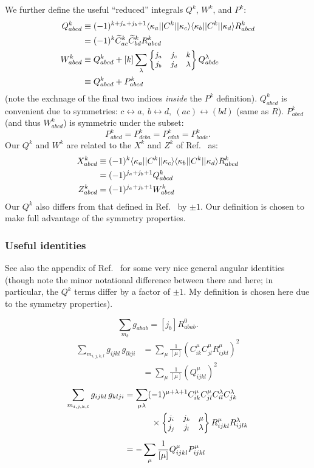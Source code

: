 \documentclass[10pt,twocolumn,a4paper]{article}%
\newcommand{\bra}[1]{\ensuremath{\langle #1|}}	%
\newcommand{\ket}[1]{\ensuremath{|#1\rangle}}	%
\newcommand{\sixj}[6]{\small\ensuremath{\begin{Bmatrix}#1&#2&#3\\#4&#5&#6\end{Bmatrix}}}	%
\newcommand{\be}{\begin{equation}}
\newcommand{\ee}{\end{equation}}
\renewcommand{\k}{\ensuremath{\kappa}}
\begin{document}
We further define the useful ``reduced'' integrals $Q^k$, $W^k$, and $P^k$:
\begin{align}
Q^k_{abcd} &\equiv  (-1)^{k + j_a+j_b+1}\bra{\k_a}|C^k|\ket{\k_c} \bra{\k_b}|C^k|\ket{\k_d} R^k_{abcd} \notag\\
&= (-1)^k \widetilde C^k_{ac}\widetilde C^k_{bd}R^k_{abcd}\\
%
W^k_{abcd} &\equiv Q^k_{abcd} + [k] \sum_\lambda \sixj{j_a}{j_c}{k}{j_b}{j_d}{\lambda}Q^\lambda_{abdc} \notag\\
& \equiv Q^k_{abcd}  + P^k_{abcd}
\end{align}
(note the exchnage of the final two indices {\em inside} the $P^k$ definition).
$Q^k_{abcd}$  is convenient due to symmetries: $c\leftrightarrow a ,~ b\leftrightarrow d  ,~ (ac)\leftrightarrow (bd)$ (same as $R$).
$P^k_{abcd}$ (and thus $W^k_{abcd}$) is symmetric under the subset:
\be
P^k_{abcd} = P^k_{dcba} = P^k_{cdab} = P^k_{badc}.
\ee
Our $Q^k$ and $W^k$ are related to the $X^k$ and $Z^k$ of Ref.~\cite{Lindgren1986} as:
\begin{align}
X^k_{abcd} &\equiv  (-1)^k \bra{\k_a}|C^k|\ket{\k_c} \bra{\k_b}|C^k|\ket{\k_d} R^k_{abcd} \notag\\
 & = (-1)^{j_a+j_b+1}Q^k_{abcd}\\
 Z^k_{abcd} &=  (-1)^{j_a+j_b+1} W^k_{abcd}
\end{align}
Our $Q^k$ also differs from that defined in Ref.~\cite{DzubaHFS1984} by $\pm1$.
Our definition is chosen to make full advantage of the symmetry properties.

\subsubsection*{Useful identities}


See also the appendix of Ref.~\cite{DzubaHFS1984} for some very nice general angular identities (though note the minor notational difference between there and here; in particular, the $Q^k$ terms differ by a factor of $\pm1$. My definition is chosen here due to the symmetry properties).

\be
\sum_{m_b}g_{abab} = [j_b] R^0_{abab}.
\ee
%
\begin{align}
\sum_{m_{i,j,k,l}}  g_{ijkl} \, g_{lkji}
    &= \sum_\mu \frac{1}{[\mu]} \left( C^\mu_{ik}C^\mu_{jl} R^\mu_{ijkl}\right)^2 \\
    &= \sum_\mu \frac{1}{[\mu]} \left( Q^\mu_{ijkl}\right)^2 
\end{align}
\begin{align}
\sum_{m_{i,j,k,l}}  g_{ijkl} \, g_{klji}
    &=\sum_{\mu \lambda}(-1)^{\mu+\lambda+1}C^\mu_{ik}C^\mu_{jl}C^\lambda_{il}C^\lambda_{jk} \notag \\
    &\phantom{=\sum_{\mu \lambda}}~~\times \sixj{j_i}{j_k}{\mu}{j_j}{j_l}{\lambda}R^\mu_{ijkl}R^\lambda_{ijlk} \\
    &=-\sum_\mu \frac{1}{[\mu]}  Q^\mu_{ijkl}P^\mu_{ijkl}
\end{align}
\end{document}
